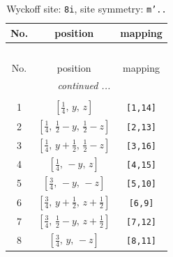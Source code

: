 \documentclass[fleqn,8pt]{jsarticle}
\begin{document}
\begin{longtable}{ccc}
\caption{Wyckoff site: {\tt 8i}, site symmetry: {\tt m'..}}
 \\
 \hline \hline
No. & position & mapping \\ \hline \endfirsthead

\multicolumn{2}{l}{\tablename\ \thetable{}} \\
 \hline \hline
No. & position & mapping \\ \hline \endhead

 \hline \hline
\multicolumn{2}{r}{\footnotesize\it continued ...} \\ \endfoot

 \hline \hline
\multicolumn{2}{r}{} \\ \endlastfoot

1 & $\left[ \frac{1}{4},\, y,\, z \right]$ & {\tt [1,14]} \\ \hline
2 & $\left[ \frac{1}{4},\, \frac{1}{2} - y,\, \frac{1}{2} - z \right]$ & {\tt [2,13]} \\ \hline
3 & $\left[ \frac{1}{4},\, y + \frac{1}{2},\, \frac{1}{2} - z \right]$ & {\tt [3,16]} \\ \hline
4 & $\left[ \frac{1}{4},\, - y,\, z \right]$ & {\tt [4,15]} \\ \hline
5 & $\left[ \frac{3}{4},\, - y,\, - z \right]$ & {\tt [5,10]} \\ \hline
6 & $\left[ \frac{3}{4},\, y + \frac{1}{2},\, z + \frac{1}{2} \right]$ & {\tt [6,9]} \\ \hline
7 & $\left[ \frac{3}{4},\, \frac{1}{2} - y,\, z + \frac{1}{2} \right]$ & {\tt [7,12]} \\ \hline
8 & $\left[ \frac{3}{4},\, y,\, - z \right]$ & {\tt [8,11]} \\
\end{longtable}
\renewcommand{\arraystretch}{1.2}
\end{document}
